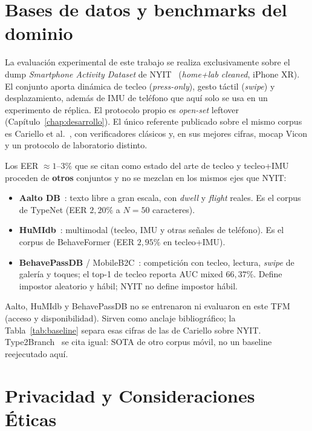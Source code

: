 \section{Bases de datos y benchmarks del dominio}

La evaluación experimental de este trabajo se realiza exclusivamente sobre el dump
\textit{Smartphone Activity Dataset} de NYIT~\cite{NYIT_dataset:2025}
(\textit{home+lab cleaned}, iPhone XR). El conjunto aporta dinámica de tecleo
(\textit{press-only}), gesto táctil (\textit{swipe}) y desplazamiento, además de IMU
de teléfono que aquí solo se usa en un experimento de réplica. El protocolo propio
es \textit{open-set} leftover (Capítulo~\ref{chap:desarrollo}). El único referente
publicado sobre el mismo corpus es Cariello et al.~\cite{cariello2025posture,cariello2026keystroke},
con verificadores clásicos y, en sus mejores cifras, mocap Vicon y un protocolo de
laboratorio distinto.

Los EER $\approx 1$--$3\%$ que se citan como estado del arte de tecleo y tecleo+IMU
proceden de \textbf{otros} conjuntos y no se mezclan en los mismos ejes que NYIT:

\begin{itemize}
    \item \textbf{Aalto DB}~\cite{acien2022typenet}: texto libre a gran escala, con
    \textit{dwell} y \textit{flight} reales. Es el corpus de TypeNet (EER $2{,}20\%$
    a $N=50$ caracteres).
    \item \textbf{HuMIdb}~\cite{senerath2023behaveformer}: multimodal (tecleo, IMU y
    otras señales de teléfono). Es el corpus de BehaveFormer (EER $2{,}95\%$ en
    tecleo+IMU).
    \item \textbf{BehavePassDB} / MobileB2C~\cite{stragapede2022mobileb2c}:
    competición con tecleo, lectura, \textit{swipe} de galería y toques; el top-1
    de tecleo reporta AUC mixed $66{,}37\%$. Define impostor aleatorio y hábil;
    NYIT no define impostor hábil.
\end{itemize}

Aalto, HuMIdb y BehavePassDB no se entrenaron ni evaluaron en este TFM (acceso y
disponibilidad). Sirven como anclaje bibliográfico; la Tabla~\ref{tab:baseline}
separa esas cifras de las de Cariello sobre NYIT. Type2Branch~\cite{gonzalez2025type2branch}
se cita igual: SOTA de otro corpus móvil, no un baseline reejecutado aquí.

\section{Privacidad y Consideraciones Éticas}

